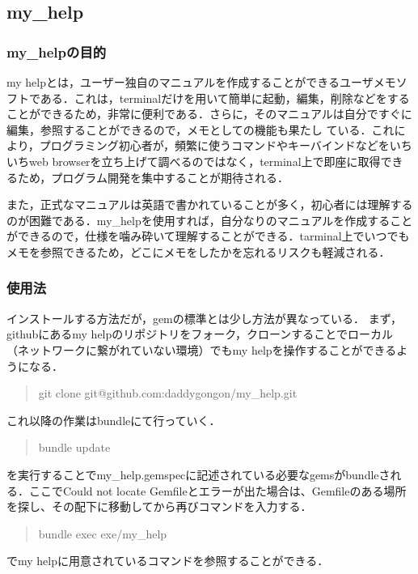\documentclass[11pt,dvipdfmx]{jsarticle}
\begin{document}
\subsection{my\_help}\label{my_help}

\subsubsection{my\_helpの目的}\label{my_helpux306eux76eeux7684}

my
helpとは，ユーザー独自のマニュアルを作成することができるユーザメモソフトである．これは，terminalだけを用いて簡単に起動，編集，削除などをすることができるため，非常に便利である．さらに，そのマニュアルは自分ですぐに編集，参照することができるので，メモとしての機能も果たし
ている．これにより，プログラミング初心者が，頻繁に使うコマンドやキーバインドなどをいちいちweb
browserを立ち上げて調べるのではなく，terminal上で即座に取得できるため，プログラム開発を集中することが期待される．

また，正式なマニュアルは英語で書かれていることが多く，初心者には理解するのが困難である．my\_helpを使用すれば，自分なりのマニュアルを作成することができるので，仕様を噛み砕いて理解することができる．tarminal上でいつでもメモを参照できるため，どこにメモをしたかを忘れるリスクも軽減される．

\subsubsection{使用法}\label{ux4f7fux7528ux6cd5}

インストールする方法だが，gemの標準とは少し方法が異なっている．
まず，githubにあるmy
helpのリポジトリをフォーク，クローンすることでローカル（ネットワークに繋がれていない環境）でもmy
helpを操作することができるようになる．

\begin{quote}
git clone git@github.com:daddygongon/my\_help.git
\end{quote}
これ以降の作業はbundleにて行っていく．

\begin{quote}
bundle update
\end{quote}
を実行することでmy\_help.gemspecに記述されている必要なgemsがbundleされる．ここでCould
not locate
Gemfileとエラーが出た場合は、Gemfileのある場所を探し、その配下に移動してから再びコマンドを入力する．

\begin{quote}
bundle exec exe/my\_help
\end{quote}
でmy helpに用意されているコマンドを参照することができる．
\end{document}
